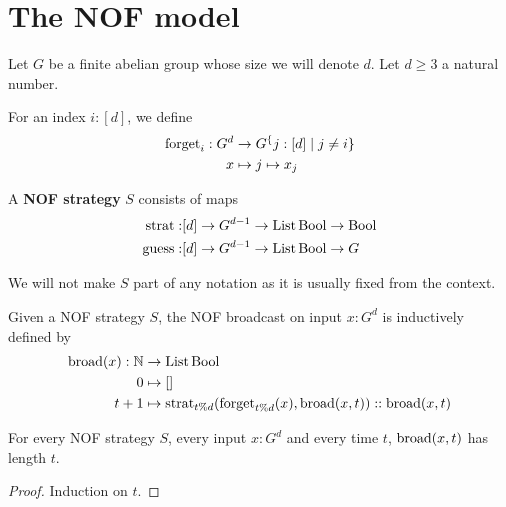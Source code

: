 \chapter{The NOF model}

Let $G$ be a finite abelian group whose size we will denote $d$. Let $d \ge 3$ a natural number.

\begin{definition}
  \label{def:forget}

  For an index $i : [d]$, we define
  \begin{align}
    \operatorname{forget}_i : G^d & \to G^\{j : [d] \mid j \ne i\} \\
    x & \mapsto j \mapsto x_j
  \end{align}
\end{definition}

\begin{definition}
  \label{def:strategy}

  A {\bf NOF strategy} $S$ consists of maps
  \begin{align}
    \operatorname{strat} : & [d] \to G^{d - 1} \to \operatorname{List} \operatorname{Bool} \to \operatorname{Bool} \\
    \operatorname{guess} : & [d] \to G^{d - 1} \to \operatorname{List} \operatorname{Bool} \to G
  \end{align}
\end{definition}

We will not make $S$ part of any notation as it is usually fixed from the context.

\begin{definition}
  \label{def:broadcast}

  Given a NOF strategy $S$, the NOF broadcast on input $x : G^d$ is inductively defined by
  \begin{align}
    \operatorname{broad}(x) : \mathbb{N} & \to \operatorname{List} \operatorname{Bool} \\
    0 & \mapsto [] \\
    t + 1 & \mapsto \operatorname{strat}_{t \% d}(\operatorname{forget}_{t \% d}(x), \operatorname{broad}(x, t)) :: \operatorname{broad}(x, t)
  \end{align}
\end{definition}

\begin{lemma}
  \label{lem:length-broadcast}

  For every NOF strategy $S$, every input $x : G^d$ and every time $t$, $\operatorname{broad}(x, t)$ has length $t$.
\end{lemma}
\begin{proof}

  Induction on $t$.
\end{proof}

